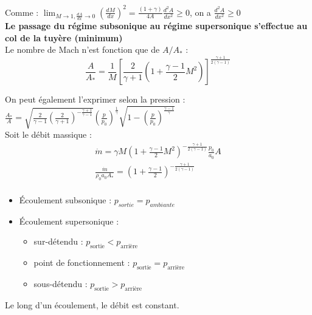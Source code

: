 \documentclass[../main.tex]{subfiles}
\begin{document}
Comme : $\lim_{M\rightarrow 1, \frac{dA}{dx}\rightarrow 0} (\frac{dM}{dx})^2 = \frac{(1+\gamma)}{4A} \frac{d^2A}{dx^2}\geq 0$, on a $\frac{d^2A}{dx^2} \geq 0$\\
\textbf{Le passage du régime subsonique au régime supersonique s'effectue au col de la tuyère (minimum)}\\

Le nombre de Mach n'est fonction que de $A/A_*$ : \begin{equation}
    \frac{A}{A_*} = \frac{1}{M} [\frac{2}{\gamma+1} (1+\frac{\gamma-1}{2}M^2)]^{\frac{\gamma+1}{2(\gamma-1)}}
\end{equation}

On peut également l'exprimer selon la pression : $\frac{A_*}{A} = \sqrt{\frac{2}{\gamma-1} (\frac{2}{\gamma+1})^{-\frac{\gamma+1}{\gamma-1}}} (\frac{p}{p_0})^{\frac{1}{\gamma}} \sqrt{1-(\frac{p}{p_0})^{\frac{\gamma-1}{\gamma}}}$\\

Soit le débit massique : \begin{equation}
    \begin{gathered}
        \dot{m} = \gamma M (1+\frac{\gamma-1}{2}M^2)^{-\frac{\gamma+1}{2(\gamma-1)}}\frac{p_0}{a_0} A\\
        \frac{\dot{m}}{\rho_0 a_0 A_*} = (1+\frac{\gamma-1}{2})^{-\frac{\gamma+1}{2(\gamma-1)}}\\
    \end{gathered}
\end{equation}

\begin{itemize}
    \item Écoulement subsonique : $p_{sortie} = p_{ambiante}$\\
    \item Écoulement supersonique : \begin{itemize}
        \item sur-détendu : $p_{\text{sortie}} < p_{\text{arrière}}$\\
        \item point de fonctionnement : $p_{\text{sortie}} = p_{\text{arrière}}$\\
        \item sous-détendu : $p_{\text{sortie}} > p_{\text{arrière}}$\\
    \end{itemize}
\end{itemize}

\warning Le long d'un écoulement, le débit est constant.\\
\end{document}
